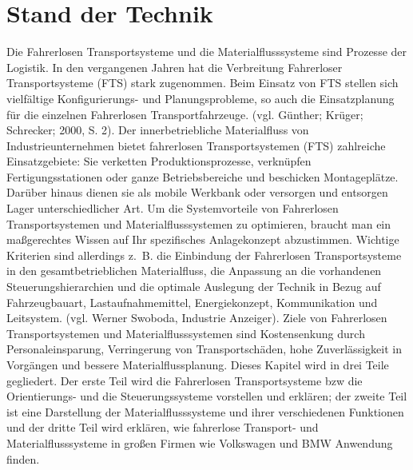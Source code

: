 \section{Stand der Technik}
Die Fahrerlosen Transportsysteme und die Materialflusssysteme sind Prozesse der Logistik. In den vergangenen Jahren hat die Verbreitung Fahrerloser Transportsysteme (FTS) stark zugenommen. Beim Einsatz von FTS stellen sich vielfältige Konfigurierungs- und Planungsprobleme, so auch die Einsatzplanung f\"ur die einzelnen Fahrerlosen Transportfahrzeuge. (vgl. Günther; Krüger; Schrecker; 2000, S. 2). Der innerbetriebliche Materialfluss von Industrieunternehmen bietet fahrerlosen Transportsystemen (FTS) zahlreiche Einsatzgebiete: Sie verketten Produktionsprozesse, verknüpfen Fertigungsstationen oder ganze Betriebsbereiche und beschicken Montageplätze. Darüber hinaus dienen sie als mobile Werkbank oder versorgen und entsorgen Lager unterschiedlicher Art. Um die Systemvorteile von Fahrerlosen Transportsystemen und Materialflusssystemen zu optimieren, braucht man ein ma\ss gerechtes Wissen auf Ihr spezifisches Anlagekonzept abzustimmen. Wichtige Kriterien sind allerdings z.~B. die Einbindung der Fahrerlosen Transportsysteme in den gesamtbetrieblichen Materialfluss, die Anpassung an die vorhandenen Steuerungshierarchien und die optimale Auslegung der Technik in Bezug auf Fahrzeugbauart, Lastaufnahmemittel, Energiekonzept, Kommunikation und Leitsystem. (vgl. Werner Swoboda, Industrie Anzeiger). Ziele von Fahrerlosen Transportsystemen und Materialflusssystemen sind Kostensenkung durch Personaleinsparung, Verringerung von Transportsch\"aden, hohe Zuverl\"assigkeit in Vorg\"angen und bessere Materialflussplanung.
Dieses Kapitel wird in drei Teile gegliedert. Der erste Teil wird die Fahrerlosen Transportsysteme bzw die Orientierungs- und die Steuerungssysteme vorstellen und erkl\"aren; der zweite Teil ist eine Darstellung der Materialflusssysteme und ihrer verschiedenen Funktionen und der dritte Teil wird erkl\"aren, wie fahrerlose Transport- und Materialflusssysteme in gro\ss en Firmen wie Volkswagen und BMW Anwendung finden.

